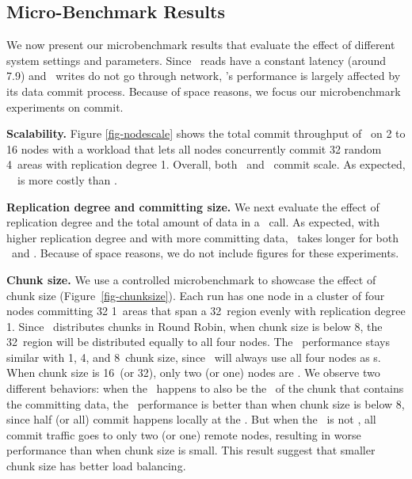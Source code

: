 

\subsection{Micro-Benchmark Results}
\label{sec:hotpot:results}

We now present our microbenchmark results that evaluate the effect of different system settings and parameters.
Since \hotpot\ reads have a constant latency (around 7.9\us) and \hotpot\ writes do not go through network,
\hotpot's performance is largely affected by its data commit process.
Because of space reasons, we focus our microbenchmark experiments on commit.

{\bf Scalability.}
Figure \ref{fig-nodescale} shows the total commit throughput of \hotpot\ on 2 to 16 nodes with a workload 
that lets all nodes concurrently commit 32 random 4\KB\ areas with replication degree 1. 
Overall, both \mrmw\ and \mrsw\ commit scale.
As expected, \mrmw\ \commitxact\ is more costly than \mrsw. 

{\bf Replication degree and committing size.} 
We next evaluate the effect of replication degree and the total amount of data in a \commitxact\ call.
As expected, with higher replication degree and with more committing data, \commitxact\ takes longer for both \mrmw\ and \mrsw.
Because of space reasons, we do not include figures for these experiments.

{\bf Chunk size.}
We use a controlled microbenchmark to showcase the effect of chunk size (Figure~\ref{fig-chunksize}).
Each run has one node in a cluster of four nodes committing 32 1\KB\ areas that span a 32\MB\ region evenly with replication degree 1.
Since \hotpot\ distributes chunks in Round Robin, 
when chunk size is below 8\MB, the 32\MB\ region will be distributed equally to all four nodes.
The \commitxact\ performance stays similar with 1, 4, and 8\MB\ chunk size,
since \commitxact\ will always use all four nodes as \on{}s.
When chunk size is 16\MB\ (or 32\MB), only two (or one) nodes are \on.
We observe two different behaviors:
when the \xn\ happens to also be the \on\ of the chunk that contains the committing data,
the \commitxact\ performance is better than when chunk size is below 8\MB, since half (or all) commit happens locally at the \xn.
But when the \xn\ is not \on, all commit traffic goes to only two (or one) remote nodes,
resulting in worse performance than when chunk size is small.
This result suggest that smaller chunk size has better load balancing.

